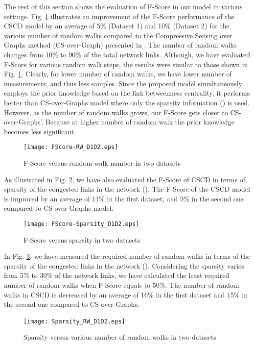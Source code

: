 \documentclass{article}
\begin{document}
The rest of this section shows the evaluation of F-Score in our model in various settings. Fig. \ref{F-ScoreRW} illustrates an improvement of the F-Score performance of the CSCD model by an average of 5\% (Dataset 1) and 10\% (Dataset 2) for the various number of random walks compared to the Compressive Sensing over Graphs method (CS-over-Graph) presented in \cite{CSoverGraph}. The number of random walks changes from 10\% to 90\% of the total network links. Although, we have evaluated F-Score for various random walk steps, the results were similar to those shown in Fig. \ref{F-ScoreRW}. 
Clearly, for lower number of random walks, we have lower number of measurements, and thus less samples. Since the proposed model simultaneously employs the prior knowledge based on the link betweenness centrality, it performs better than CS-over-Graphs model \cite{CSoverGraph} where only the sparsity information () is used. However, as the number of random walks grows, our F-Score gets closer to CS-over-Graphs'. Because at higher number of random walk the prior knowledge becomes less significant. \begin{figure}[h]
\centering
\texttt{[image: FScore-RW\_D1D2.eps]}
\caption{F-Score versus random walk number in two datasets}
\label{F-ScoreRW}
\end{figure}
As illustrated in Fig. \ref{F-ScoreSparsity}, we have also evaluated the F-Score of CSCD in terms of sparsity of the congested links in the network (). The F-Score of the CSCD model is improved by an average of 11\% in the first dataset, and 9\% in the second one compared to CS-over-Graphs model.
\begin{figure}[h]
\centering
\texttt{[image: FScore-Sparsity\_D1D2.eps]} 
\caption{F-Score versus sparsity in two datasets}
\label{F-ScoreSparsity}
\end{figure}
In Fig. \ref{RWSparsity}, we have measured the required number of random walks in terms of the sparsity of the congested links in the network (). Considering the sparsity varies from 5\% to 30\% of the network links, we have calculated the least required number of random walks when F-Score equals to 50\%. The number of random walks in CSCD is decreased by an average of 16\% in the first dataset and 15\% in the second one compared to CS-over-Graphs. \begin{figure}[h]
\centering
\texttt{[image: Sparsity\_RW\_D1D2.eps]}~ 
\caption{Sparsity versus various number of random walks in two datasets }
\label{RWSparsity}
\end{figure}
\end{document}
